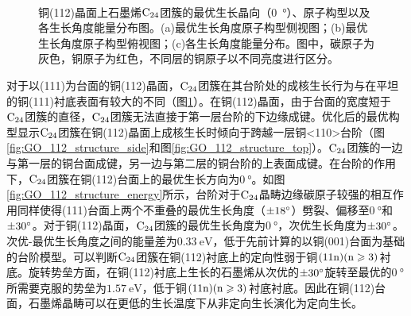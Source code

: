 \begin{figure}[htb]
    \\[-0.5ex]
    \caption{铜(112)晶面上石墨烯$\rm{C_{24}}$团簇的最优生长晶向（\SI{0}  {\degree}）、原子构型以及各生长角度能量分布图。(a)最优生长角度原子构型侧视图；(b)最优生长角度原子构型俯视图；(c)各生长角度能量分布。图中，碳原子为灰色，铜原子为红色，不同层的铜原子以不同亮度进行区分。}
    \label{fig:GO_C24_112}
\end{figure}

对于以(111)为台面的铜(112)晶面，$\rm{C_{24}}$团簇在其台阶处的成核生长行为与在平坦的铜(111)衬底表面有较大的不同（图\ref{fig:GO_C24_112}）。在铜(112)晶面，由于台面的宽度短于$\rm{C_{24}}$团簇的直径，$\rm{C_{24}}$团簇无法直接于第一层台阶的下边缘成键。优化后的最优构型显示$\rm{C_{24}}$团簇在铜(112)晶面上成核生长时倾向于跨越一层铜<110>台阶（图\ref{fig:GO_112_structure_side}和图\ref{fig:GO_112_structure_top}）。$\rm{C_{24}}$团簇的一边与第一层的铜台面成键，另一边与第二层的铜台阶的上表面成键。在台阶的作用下，$\rm{C_{24}}$团簇在铜(112)台面上的最优生长方向为$\SI{0}{\degree}$。如图\ref{fig:GO_112_structure_energy}所示，台阶对于$\rm{C_{24}}$晶畴边缘碳原子较强的相互作用同样使得(111)台面上两个不重叠的最优生长角度（$\SI{\pm 18 }{\degree}$）劈裂、偏移至$\SI{0}{\degree}$和$\SI{\pm 30 }{\degree}$。对于铜(112)晶面，$\rm{C_{24}}$团簇的最优生长角度为$\SI{0}{\degree}$，次优生长角度为$\SI{\pm 30 }{\degree}$。次优-最优生长角度之间的能量差为$\SI{0.33}{\electronvolt}$，低于先前计算的以铜(001)台面为基础的台阶模型。可以判断$\rm{C_{24}}$团簇在铜(112)衬底上的定向性弱于铜$\rm{(11n)(n \geqslant 3)}$衬底。旋转势垒方面，在铜(112)衬底上生长的石墨烯从次优的$\SI{\pm 30 }{\degree}$旋转至最优的$\SI{0}{\degree}$所需要克服的势垒为$\SI{1.57 }{\electronvolt}$，低于铜$\rm{(11n)(n \geqslant 3)}$衬底衬底。因此在铜(112)台面，石墨烯晶畴可以在更低的生长温度下从非定向生长演化为定向生长。

